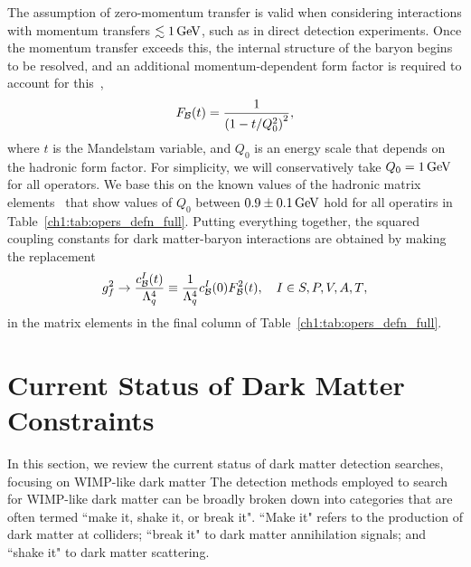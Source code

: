 The assumption of zero-momentum transfer is valid when considering interactions with momentum transfers $\lesssim 1{\rm \,GeV}$, such as in direct detection experiments. Once the momentum transfer exceeds this, the internal structure of the baryon begins to be resolved, and an additional momentum-dependent form factor is required to account for this~\cite{Thomas_ElectromagneticStructureNucleon},
\begin{equation}
    F_{\cal B}(t) = \frac{1}{\left( 1 - t/Q_0^2\right)^2},
\end{equation}
where $t$ is the Mandelstam variable, and $Q_0$ is an energy scale that depends on the hadronic form factor. For simplicity, we will conservatively take $Q_0 = 1 {\rm \,GeV}$ for all operators. We base this on the known values of the hadronic matrix elements~\cite{Zanotti:2017bte_Transversespindensities,Alarcon:2017ivh_Nucleonformfactors} that show values of $Q_0$ between $0.9\pm 0.1{\rm \,GeV}$ hold for all operatirs in Table~\ref{ch1:tab:opers_defn_full}.
Putting everything together, the squared coupling constants for dark matter-baryon interactions are obtained by making the replacement
\begin{equation}
    g_f^2 \rightarrow \frac{c^I_{\cal B}(t)}{\Lambda_q^4} \equiv \frac{1}{\Lambda_q^4}c_{\cal B}^I(0)F^2_{\cal B}(t),\quad I\in {S, P, V, A, T},
\end{equation}
in the matrix elements in the final column of Table~\ref{ch1:tab:opers_defn_full}.



\section{Current Status of Dark Matter Constraints}

In this section, we review the current status of dark matter detection searches, focusing on WIMP-like dark matter 
The detection methods employed to search for WIMP-like dark matter can be broadly broken down into categories that are often termed ``make it, shake it, or break it". ``Make it" refers to the production of dark matter at colliders; ``break it" to dark matter annihilation signals; and ``shake it" to dark matter scattering. 


